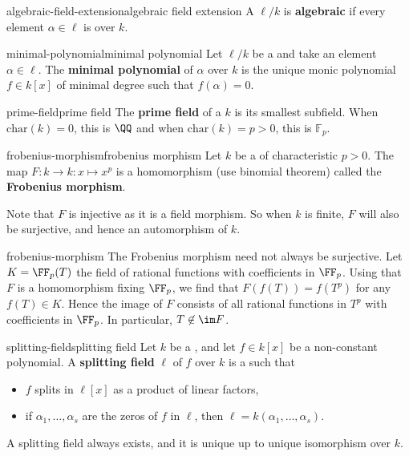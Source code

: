 \begin{topic}{algebraic-field-extension}{algebraic field extension}
    A  $\ell / k$ is \textbf{algebraic} if every element $\alpha \in \ell$ is  over $k$.
\end{topic}

\begin{topic}{minimal-polynomial}{minimal polynomial}
    Let $\ell / k$ be a  and take an  element $\alpha \in \ell$. The \textbf{minimal polynomial} of $\alpha$ over $k$ is the unique monic polynomial $f \in k[x]$ of minimal degree such that $f(\alpha) = 0$.
\end{topic}

\begin{topic}{prime-field}{prime field}
    The \textbf{prime field} of a  $k$ is its smallest subfield. When $\text{char}(k) = 0$, this is $\QQ$ and when $\text{char}(k) = p > 0$, this is $\mathbb{F}_p$.
\end{topic}

\begin{topic}{frobenius-morphism}{frobenius morphism}
    Let $k$ be a  of characteristic $p > 0$. The map $F : k \to k : x \mapsto x^p$ is a homomorphism (use binomial theorem) called the \textbf{Frobenius morphism}.
    
    Note that $F$ is injective as it is a field morphism. So when $k$ is finite, $F$ will also be surjective, and hence an automorphism of $k$. 
\end{topic}

\begin{example}{frobenius-morphism}
    The Frobenius morphism need not always be surjective. Let $K = \FF_p(T)$ the field of rational functions with coefficients in $\FF_p$. Using that $F$ is a homomorphism fixing $\FF_p$, we find that $F(f(T)) = f(T^p)$ for any $f(T) \in K$. Hence the image of $F$ consists of all rational functions in $T^p$ with coefficients in $\FF_p$. In particular, $T \not\in \im F$.
\end{example}

\begin{topic}{splitting-field}{splitting field}
    Let $k$ be a , and let $f \in k[x]$ be a non-constant polynomial. A \textbf{splitting field} $\ell$ of $f$ over $k$ is a  such that
    \begin{itemize}
        \item $f$ splits in $\ell[x]$ as a product of linear factors,
        \item if $\alpha_1, \ldots, \alpha_s$ are the zeros of $f$ in $\ell$, then $\ell = k(\alpha_1, \ldots, \alpha_s)$.
    \end{itemize}
    A splitting field always exists, and it is unique up to unique isomorphism over $k$.
\end{topic}

